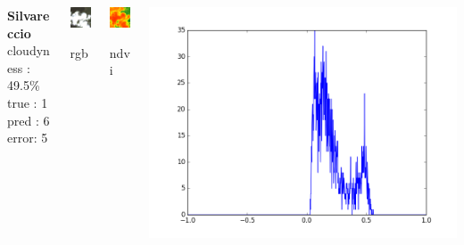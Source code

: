 \documentclass[c]{beamer}
\begin{document}
\begin{frame}
{\begin{columns}
 \begin{column}{0.12\textwidth}
 \textbf{Silvareccio}\\
 cloudyness : 49.5\%\\
 true : 1\\
 pred : 6\\
 error: 5\\
 \end{column}
 \begin{column}{0.1\textwidth}
  \begin{overlayarea}{\linewidth}{1.3cm}
    \centering\vfill
    \includegraphics[scale=0.60]{images/Silvareccio/08_rgb.png}
  \end{overlayarea}
  \begin{overlayarea}{\linewidth}{0.5cm}
    \centering
    \tiny rgb \par
  \end{overlayarea}
 \end{column}
 \begin{column}{0.1\textwidth}
  \begin{overlayarea}{\linewidth}{1.3cm}
    \centering\vfill
    \includegraphics[scale=0.60]{images/Silvareccio/08_ndvi.png}
  \end{overlayarea}
  \begin{overlayarea}{\linewidth}{0.5cm}
    \centering
    \tiny ndvi \par
  \end{overlayarea}
 \end{column}
 \begin{column}{0.12\textwidth}
  \begin{overlayarea}{\linewidth}{1.3cm}
    \centering\vfill
    \includegraphics[scale=0.07]{images/Silvareccio/08_ndvi_histo.png}

\end{overlayarea}
\end{column}
\end{columns}}
\end{frame}
\end{document}
